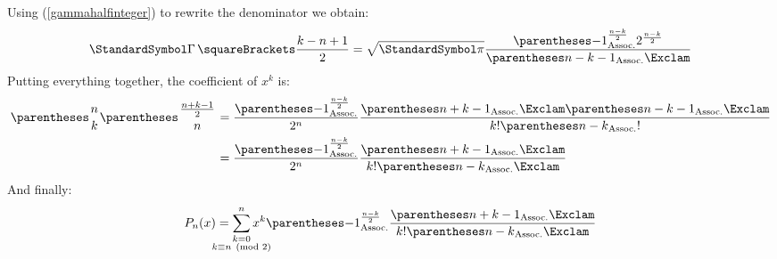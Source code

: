 \documentclass[10pt, a4paper, twoside]{basestyle}
\begin{document}
Using (\ref{gammahalfinteger}) to rewrite the denominator we obtain:
\begin{equation*}
\Gamma\of{\frac{k - n + 1}{2}} =
  \sqrt{\Pi}
  \frac
    {\pa{-1}^{\frac{n - k}{2}}{2^{\frac{n - k}{2}}}}
    {\DoubleFactorial{\pa{n - k - 1}}}
\end{equation*}
Putting everything together, the coefficient of $x^k$ is:
\begin{align*}
\binom{n}{k} \binom{\frac{n + k - 1}{2}}{n} &=
  \frac
    {\pa{-1}^{\frac{n - k}{2}}}
    {2^n}
  \frac
    {\DoubleFactorial{\pa{n + k - 1}}\DoubleFactorial{\pa{n - k - 1}}}
    {\Factorial{k}\Factorial{\pa{n - k}}}\\
&=
  \frac
    {\pa{-1}^{\frac{n - k}{2}}}
    {2^n}
  \frac
    {\DoubleFactorial{\pa{n + k - 1}}}
    {\Factorial{k}\DoubleFactorial{\pa{n - k}}}
\end{align*}
And finally:
\begin{equation*}
P_n(x) = \sum{\substack{k = 0\\ k \equiv n \pmod 2}}[n]
  x^k \pa{-1}^{\frac{n - k}{2}}
  \frac
    {\DoubleFactorial{\pa{n + k - 1}}}
    {\Factorial{k}\DoubleFactorial{\pa{n - k}}}
\end{equation*}
\end{document}
